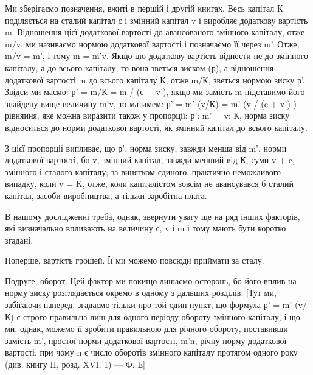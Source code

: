 Ми зберігаємо позначення, вжиті в першій і другій книгах.
Весь капітал К поділяється на сталий капітал с і змінний капітал
v і виробляє додаткову вартість m. Відношення цієї додаткової
вартості до авансованого змінного капіталу, отже m/v, ми
називаємо нормою додаткової вартості і позначаємо її через m'.
Отже, m/v = m', і тому m = m'v. Якщо цю додаткову вартість
віднести не до змінного капіталу, а до всього капіталу, то вона
зветься зиском (р), а відношення додаткової вартості m до
всього капіталу К, отже m/К, зветься нормою зиску р'. Звідси ми
маємо:
р' = m/К = m / (с + v'),
якщо ми замість m підставимо його знайдену вище величину
m'v, то матимем:
р' = m' (v/К) = m' (v / (c + v') )
рівняння, яке можна виразити також у пропорції:
р’: m' = v: К,
норма зиску відноситься до норми додаткової вартості, як змінний
капітал до всього капіталу.

З цієї пропорції випливає, що р', норма зиску, завжди менша
від m', норми додаткової вартості, бо v, змінний капітал, завжди
менший від К, суми v + c, змінного і сталого капіталу; за винятком
єдиного, практично неможливого випадку, коли v = K, отже,
коли капіталістом зовсім не авансувався б сталий капітал, засоби
виробництва, а тільки заробітна плата.

В нашому дослідженні треба, однак, звернути увагу ще на
ряд інших факторів, які визначально впливають на величину с,
v і m і тому мають бути коротко згадані.

Поперше, вартість грошей. Її ми можемо повсюди приймати
за сталу.

Подруге, оборот. Цей фактор ми покищо лишаємо осторонь,
бо його вплив на норму зиску розглядається окремо в одному
з дальших розділів. [Тут ми, забігаючи наперед, згадаємо тільки
про той один пункт, що формула р' = m' (v/К) є строго правильна
лиш для одного періоду обороту змінного капіталу, і що ми,
однак, можемо її зробити правильною для річного обороту, поставивши
замість m', простої норми додаткової вартості, m'n,
річну норму додаткової вартості; при чому n є число оборотів
змінного капіталу протягом одного року (див. книгу II, розд.
XVI, 1) — Ф. Е]
